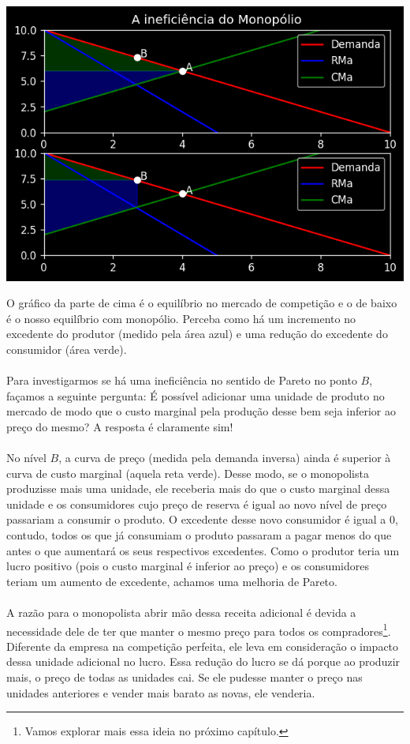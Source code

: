 \documentclass[a4paper,11pt,oneside]{book}
\theoremstyle{definition}
\theoremstyle{break}
\begin{document}
\begin{center}
\includegraphics[scale=0.8]{cap25_4-inef_monopolio.png}
\end{center}

O gráfico da parte de cima é o equilíbrio no mercado de competição e o de baixo é o nosso equilíbrio com monopólio. Perceba como há um incremento no excedente do produtor (medido pela área azul) e uma redução do excedente do consumidor (área verde).
\\
\\
Para investigarmos se há uma ineficiência no sentido de Pareto no ponto $B$, façamos a seguinte pergunta: É possível adicionar uma unidade de produto no mercado de modo que o custo marginal pela produção desse bem seja inferior ao preço do mesmo? A resposta é claramente sim!
\\
\\
No nível $B$, a curva de preço (medida pela demanda inversa) ainda é superior à curva de custo marginal (aquela reta verde). Desse modo, se o monopolista produzisse mais uma unidade, ele receberia mais do que o custo marginal dessa unidade e os consumidores cujo preço de reserva é igual ao novo nível de preço passariam a consumir o produto. O excedente desse novo consumidor é igual a $0$, contudo, todos os que já consumiam o produto passaram a pagar menos do que antes o que aumentará os seus respectivos excedentes. Como o produtor teria um lucro positivo (pois o custo marginal é inferior ao preço) e os consumidores teriam um aumento de excedente, achamos uma melhoria de Pareto.
\\
\\
A razão para o monopolista abrir mão dessa receita adicional é devida a necessidade dele de ter que manter o mesmo preço para todos os compradores\footnote{Vamos explorar mais essa ideia no próximo capítulo.}. Diferente da empresa na competição perfeita, ele leva em consideração o impacto dessa unidade adicional no lucro. Essa redução do lucro se dá porque ao produzir mais, o preço de todas as unidades cai. Se ele pudesse manter o preço nas unidades anteriores e vender mais barato as novas, ele venderia. 
\end{document}
